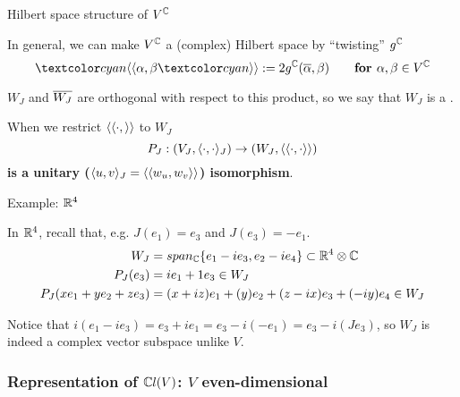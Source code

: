 \begin{frame}{Hilbert space structure of $V^\mathbb C$} %
    
    In general, we can make $V^\mathbb C$ a (complex) Hilbert space by ``twisting'' $g^\mathbb C$ \[ \defn{\bbra} \alpha, \beta \defn{\kket} := 2 g^\CC(\conj{\alpha}, \beta) \qquad \textbf{for } \alpha, \beta \in V^\CC \]
    
    $W_J$ and $\overline{W_J}$ are orthogonal with respect to this product, so we say that $W_J$ is a .
    
    When we restrict $\langle\langle \cdot , \rangle\rangle$ to $W_J$ \[P_J: (V_J, \langle \cdot, \cdot \rangle_J) \to (W_J, \langle\langle \cdot, \cdot \rangle\rangle) \] \textbf{is a unitary ($\langle u, v \rangle_J = \langle\langle w_u, w_v \rangle\rangle$) isomorphism}.
    
\end{frame}

\begin{frame}{Example: $\mathbb R^4$} %

    In $\mathbb R^4$, recall that, e.g. $J(e_1) = e_3$ and $J(e_3) = -e_1$.
    \begin{align*}
        W_J &= span_\mathbb C\{e_1 -i e_3, e_2 - ie_4\} \subset{\mathbb R^4 \otimes \mathbb C} \\
        P_J(e_3) &= ie_1 + 1e_3 \in W_J \\
        P_J(x e_1 + y e_2 + z e_3) &= (x + iz)e_1 + (y)e_2 + (z - ix)e_3 + (-iy)e_4\in W_J
    \end{align*}
    


Notice that $i(e_1 - i e_3) = e_3 + ie_1 = e_3 - i (-e_1) = e_3 - i (J e_3)$, so $W_J$ is indeed a complex vector subspace unlike $V$.

\end{frame}

\subsubsection{Representation of $\mathbb C l(V)$: $V$ even-dimensional}

